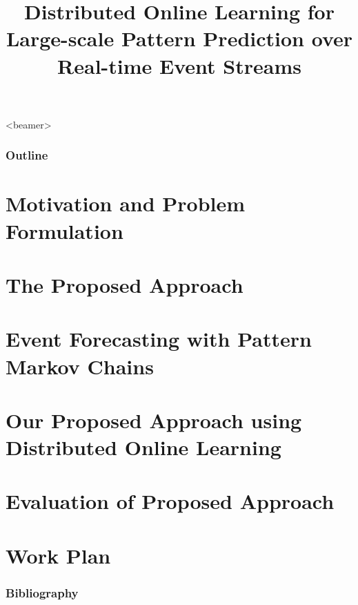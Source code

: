 \documentclass{beamer}
\title{	Distributed Online Learning for Large-scale Pattern Prediction over Real-time Event Streams}
\begin{document}



	\begin{frame}<beamer>
		\frametitle{Outline}
		\tableofcontents
	\end{frame}


\section{Motivation and Problem Formulation}

\section{The Proposed Approach}

\section{Event Forecasting with Pattern Markov Chains}

\section{Our Proposed Approach using Distributed Online Learning}

\section{Evaluation of Proposed Approach}

\section{Work Plan}



\begin{frame}[allowframebreaks]
	\frametitle{Bibliography}
	 
	
	
\end{frame}
\end{document}
